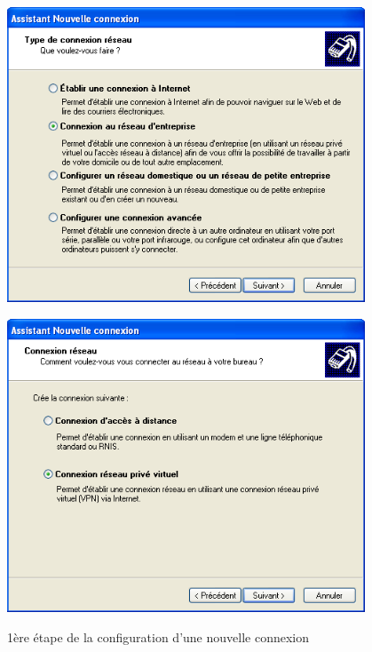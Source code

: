 \begin{figure}[H]
	\begin{minipage}{0.5\textwidth}
		\begin{flushleft} \large
			\includegraphics[width=0.95\textwidth]{partie_2/screen_windows/etape1.PNG}\\
		\end{flushleft}
	\end{minipage}
	\begin{minipage}{0.49\textwidth}
		\begin{flushright} \large
			\includegraphics[width=0.95\textwidth]{partie_2/screen_windows/etape2.PNG}\\
		\end{flushright}
	\end{minipage}
	\caption{1ère étape de la configuration d'une nouvelle connexion}
	\label{VPN_ETAPE1}
\end{figure}
~\

